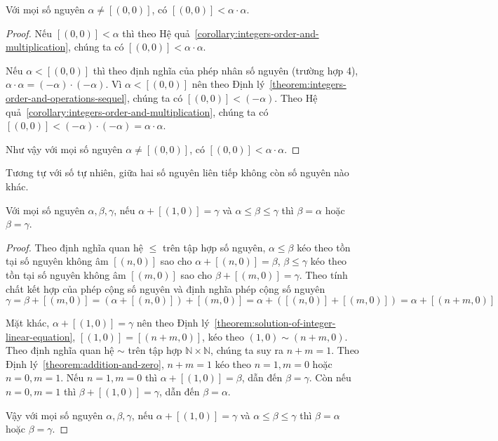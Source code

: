 \begin{theorem}\label{theorem:square-of-nonzero-integers}
    Với mọi số nguyên $\alpha\ne [(0,0)]$, có $[(0,0)] < \alpha\cdot\alpha$.
\end{theorem}

\begin{proof}
    Nếu $[(0,0)] < \alpha$ thì theo Hệ quả~\ref{corollary:integers-order-and-multiplication}, chúng ta có $[(0,0)] < \alpha\cdot\alpha$.

    Nếu $\alpha < [(0,0)]$ thì theo định nghĩa của phép nhân số nguyên (trường hợp 4), $\alpha\cdot\alpha = (-\alpha)\cdot(-\alpha)$. Vì $\alpha < [(0,0)]$ nên theo Định lý~\ref{theorem:integers-order-and-operations-sequel}, chúng ta có $[(0,0)] < (-\alpha)$. Theo Hệ quả~\ref{corollary:integers-order-and-multiplication}, chúng ta có $[(0,0)] < (-\alpha)\cdot(-\alpha) = \alpha\cdot\alpha$.

    Như vậy với mọi số nguyên $\alpha\ne [(0,0)]$, có $[(0,0)] < \alpha\cdot\alpha$.
\end{proof}

Tương tự với số tự nhiên, giữa hai số nguyên liên tiếp không còn số nguyên nào khác.
\begin{theorem}
    Với mọi số nguyên $\alpha, \beta, \gamma$, nếu $\alpha + [(1,0)] = \gamma$ và $\alpha \leq \beta \leq \gamma$ thì $\beta = \alpha$ hoặc $\beta = \gamma$.
\end{theorem}

\begin{proof}
    Theo định nghĩa quan hệ $\leq$ trên tập hợp số nguyên, $\alpha \leq \beta$ kéo theo tồn tại số nguyên không âm $[(n,0)]$ sao cho $\alpha + [(n, 0)] = \beta$, $\beta \leq \gamma$ kéo theo tồn tại số nguyên không âm $[(m, 0)]$ sao cho $\beta + [(m, 0)] = \gamma$. Theo tính chất kết hợp của phép cộng số nguyên và định nghĩa phép cộng số nguyên
    \[
        \gamma = \beta + [(m, 0)] = (\alpha + [(n, 0)]) + [(m, 0)] = \alpha + ([(n, 0)] + [(m, 0)]) = \alpha + [(n+m, 0)]
    \]

    Mặt khác, $\alpha + [(1, 0)] = \gamma$ nên theo Định lý~\ref{theorem:solution-of-integer-linear-equation}, $[(1, 0)] = [(n+m, 0)]$, kéo theo $(1, 0)\sim (n+m, 0)$. Theo định nghĩa quan hệ $\sim$ trên tập hợp $\mathbb{N}\times\mathbb{N}$, chúng ta suy ra $n + m = 1$. Theo Định lý~\ref{theorem:addition-and-zero}, $n + m = 1$ kéo theo $n = 1, m = 0$ hoặc $n = 0, m = 1$. Nếu $n = 1, m = 0$ thì $\alpha + [(1, 0)] = \beta$, dẫn đến $\beta = \gamma$. Còn nếu $n = 0, m = 1$ thì $\beta + [(1, 0)] = \gamma$, dẫn đến $\beta = \alpha$.

    Vậy với mọi số nguyên $\alpha, \beta, \gamma$, nếu $\alpha + [(1,0)] = \gamma$ và $\alpha \leq \beta \leq \gamma$ thì $\beta = \alpha$ hoặc $\beta = \gamma$.
\end{proof}

